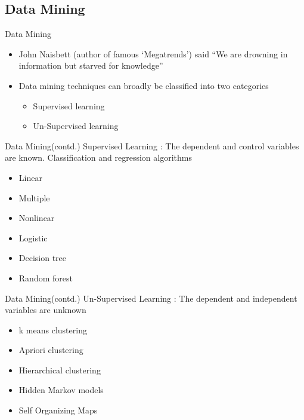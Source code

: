 \documentclass{beamer}
\begin{document}
\subsection{Data Mining}
\begin{frame}{Data Mining}
	\begin{itemize}
		\item John Naisbett (author of famous `Megatrends') said ``We are drowning in information but starved for knowledge''
		\item Data mining techniques can broadly be classified into two categories
		\begin{itemize}
			\item Supervised learning
			\item Un-Supervised learning
		\end{itemize}
	\end{itemize}
\end{frame}
\begin{frame}{Data Mining(contd.)}
	Supervised Learning : The dependent and control variables are known. Classification and regression algorithms
	\begin{itemize}
		\item Linear 
		\item Multiple 
		\item Nonlinear
		\item Logistic
		\item Decision tree
		\item Random forest
	\end{itemize}
	
\end{frame}
\begin{frame}{Data Mining(contd.)}
	Un-Supervised Learning : The dependent and independent variables are unknown
	\begin{itemize}
		\item k means clustering
		\item Apriori clustering
		\item Hierarchical clustering
		\item Hidden Markov models
		\item Self Organizing Maps
	\end{itemize}
\end{frame}
\end{document}
